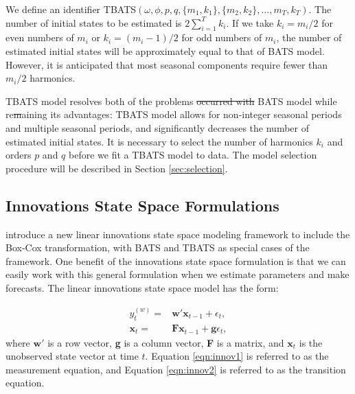 \documentclass{uwstat572}
\newcommand{\vmdel}[1]{\sout{#1}}
\newcommand{\vmadd}[1]{\textbf{\color{red}{#1}}}
\begin{document}
We define an identifier TBATS$( \omega, \phi, p, q, \{m_1,k_1\}, \{m_2,k_2\},...,{m_T,k_T} )$. The number of initial states to be estimated is $2\sum\limits_{i=1}^T k_i$. If we take $k_i=m_i/2$ for even numbers of $m_i$ or $k_i=(m_i-1)/2$ for odd numbers of $m_i$, the number of estimated initial states will be approximately equal to that of BATS model. However, it is anticipated that most seasonal components require fewer than $m_i/2$ harmonics. 

\vmadd{The} TBATS model resolves both of the problems \vmdel{occurred with} \vmadd{of the} BATS model while re\vmdel{m}\vmadd{t}aining its advantages: \vmadd{the} TBATS model allows for non-integer seasonal periods and multiple seasonal periods, and significantly decreases the number of estimated initial states. It is necessary to select the number of harmonics $k_i$ and orders $p$ and $q$ before we fit a TBATS model to data. The model selection procedure will be described in Section \ref{sec:selection}. 

\subsection{Innovations State Space Formulations}
\hspace{4ex}\citet{de2011forecasting} introduce a new linear innovations state space modeling framework to include the Box-Cox transformation, with BATS and TBATS as special cases of the framework. One benefit of the innovations state space formulation is that we can easily work with this general formulation when we estimate parameters and make forecasts. The linear innovations state space model has the form:

\begin{subequations}
\begin{align}
y_t^{  (w)}=&\textbf{w}'\textbf{x}_{t-1}+\epsilon_t, \label{eqn:innov1}\\
\textbf{x}_t=&\textbf{Fx}_{t-1}+\textbf{g}\epsilon_t, \label{eqn:innov2}
\end{align}
\end{subequations}
\noindent where $\textbf{w}'$ is a row vector, \textbf{g} is a column vector, \textbf{F} is a matrix, and $\textbf{x}_t$ is the unobserved state vector at time $t$. Equation \ref{eqn:innov1} is referred to as the measurement equation, and Equation \ref{eqn:innov2} is referred to as the transition equation.
\end{document}
